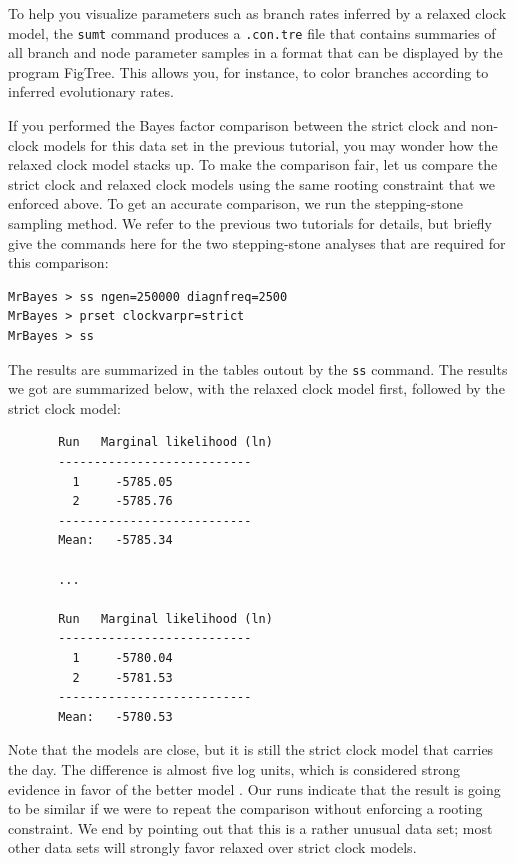 \documentclass[12pt]{book}
\newcommand{\ttt}[1]{\texttt{#1} }
\begin{document}
To help you visualize parameters such as branch rates inferred by a relaxed clock model, the
\ttt{sumt} command produces a \ttt{.con.tre} file that contains summaries of all branch and node
parameter samples in a format that can be displayed by the program FigTree. This allows you, for
instance, to color branches according to inferred evolutionary rates.

If you performed the Bayes factor comparison between the strict clock and non-clock models for this
data set in the previous tutorial, you may wonder how the relaxed clock model stacks up. To make
the comparison fair, let us compare the strict clock and relaxed clock models using the same
rooting constraint that we enforced above. To get an accurate comparison, we run the stepping-stone
sampling method. We refer to the previous two tutorials for details, but briefly give the commands
here for the two stepping-stone analyses that are required for this comparison:

\begin{verbatim}
MrBayes > ss ngen=250000 diagnfreq=2500
MrBayes > prset clockvarpr=strict
MrBayes > ss
\end{verbatim}

The results are summarized in the tables outout by the \ttt{ss} command. The results we got are
summarized below, with the relaxed clock model first, followed by the strict clock model:

\footnotesize
\begin{singlespacing}
\begin{verbatim}
       Run   Marginal likelihood (ln)
       ---------------------------
         1     -5785.05   
         2     -5785.76   
       ---------------------------
       Mean:   -5785.34
       
       ...
       
       Run   Marginal likelihood (ln)
       ---------------------------
         1     -5780.04   
         2     -5781.53   
       ---------------------------
       Mean:   -5780.53
\end{verbatim}
\end{singlespacing}
\normalsize

Note that the models are close, but it is still the strict clock model that carries the day. The
difference is almost five log units, which is considered strong evidence in favor of the better
model \cite{kass95}. Our runs indicate that the result is going to be similar if we were to repeat
the comparison without enforcing a rooting constraint. We end by pointing out that this is a rather
unusual data set; most other data sets will strongly favor relaxed over strict clock models.
\end{document}
